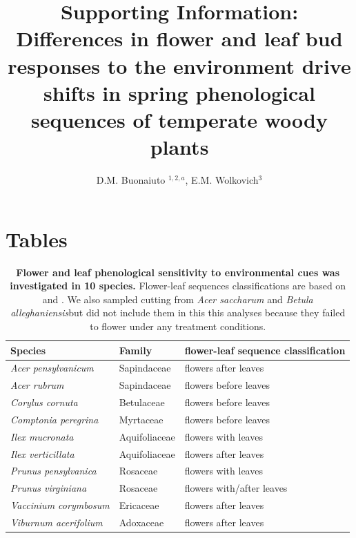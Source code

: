 \documentclass[11pt]{article}
\title{Supporting Information: Differences in flower and leaf bud responses to the environment drive shifts in spring phenological sequences of temperate woody plants}
\date{}
\author{D.M. Buonaiuto $^{1,2,a}$, E.M. Wolkovich$^{3}$}
\begin{document}
\maketitle

\section*{Tables}
\begin{table}[ht]
\centering
\begin{tabular}{lll}
  \hline
  Species & Family  & flower-leaf sequence classification  \\ 
  \hline
  \textit{Acer pensylvanicum}& Sapindaceae & flowers after leaves\\
  \textit{Acer rubrum}& Sapindaceae & flowers before leaves\\
  \textit{Corylus cornuta}& Betulaceae & flowers before leaves\\
  \textit{Comptonia peregrina}& Myrtaceae & flowers before leaves\\
  \textit{Ilex mucronata} & Aquifoliaceae & flowers with leaves\\
   \textit{Ilex verticillata} & Aquifoliaceae & flowers after leaves\\
   \textit{Prunus pensylvanica} & Rosaceae & flowers with leaves\\
   \textit{Prunus virginiana} & Rosaceae & flowers with/after leaves\\
   \textit{Vaccinium corymbosum} & Ericaceae & flowers after leaves\\
   \textit{Viburnum acerifolium} & Adoxaceae & flowers after leaves\\
   \hline
\end{tabular}
\caption{\textbf{Flower and leaf phenological sensitivity to environmental cues was investigated in 10 species.} Flower-leaf sequences classifications are based on \citet{Barnes2004} and \citet{Barnes2016}. We also sampled cutting from \textit{Acer saccharum} and \textit{Betula alleghaniensis}but did not include them in this this analyses because they failed to flower under any treatment conditions.}
\label{tab:splist}
\end{table}
\end{document}
